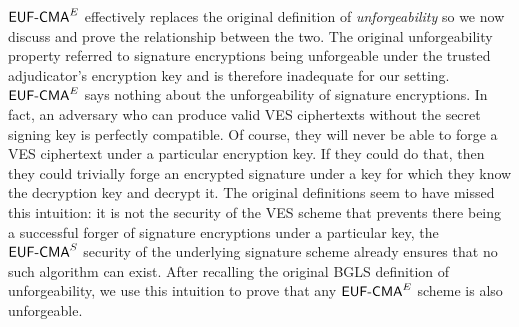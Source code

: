 $\textsf{EUF-CMA}^E$ effectively replaces the original definition of \emph{unforgeability} so we now discuss and prove the relationship between the two.
The original unforgeability property referred to signature encryptions being unforgeable under the trusted adjudicator's encryption key and is therefore inadequate for our setting.
$\textsf{EUF-CMA}^E$ says nothing about the unforgeability of signature encryptions.
In fact, an adversary who can produce valid VES ciphertexts without the secret signing key is perfectly compatible. %
Of course, they will never be able to forge a VES ciphertext under a particular encryption key.
If they could do that, then they could trivially forge an encrypted signature under a key for which they know the decryption key and decrypt it.
The original definitions seem to have missed this intuition: it is not the security of the VES scheme that prevents there being a successful forger of signature encryptions under a particular key, the $\textsf{EUF-CMA}^S$ security of the underlying signature scheme already ensures that no such algorithm can exist.
After recalling the original BGLS definition of unforgeability, we use this intuition to prove that any $\textsf{EUF-CMA}^E$ scheme is also unforgeable.

